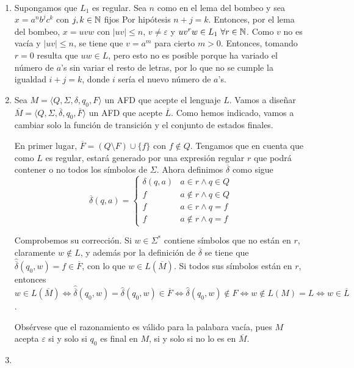 \documentclass[11pt]{article}
\begin{document}
\begin{solucion}\
\begin{enumerate}
\item Supongamos que $L_1$ es regular. Sea $n$ como en el lema del bombeo y sea $x=a^nb^jc^k$ con $j,k\in\mathbb{N}$ fijos Por hipótesis $n+j=k$. Entonces, por el lema del bombeo, $x=uvw$ con $|uv|\leq n$, $v\neq\varepsilon$ y $uv^rw\in L_1\ \forall r\in\mathbb{N}$. Como $v$ no es vacía y $|uv|\leq n$, se tiene que $v=a^m$ para cierto $m>0$. Entonces, tomando $r=0$ resulta que $uw\in L$, pero esto no es posible porque ha variado el número de $a$'s sin variar el resto de letras, por lo que no se cumple la igualdad $i+j=k$, donde $i$ sería el nuevo número de $a$'s. 
\item Sea $M=\langle Q,\Sigma, \delta, q_0,F\rangle$ un AFD que acepte el lenguaje $L$. Vamos a diseñar $\overline{M}=\langle Q,\Sigma,\overline{\delta},q_0, \overline{F}\rangle$ un AFD que acepte $\overline{L}$. Como hemos indicado, vamos a cambiar solo la función de transición y el conjunto de estados finales. 

En primer lugar, $\overline{F}=(Q\setminus F)\cup\{f\}$ con $f\notin Q$. Tengamos que en cuenta que como $L$ es regular, estará generado por una expresión regular $r$ que podrá contener o no todos los símbolos de $\Sigma$. Ahora definimos $\overline{\delta}$ como sigue
\[
\overline{\delta}(q,a)=\begin{cases}
\delta(q,a) & a\in r\land q\in Q\\
 f & a\notin r\land q\in Q\\
 f   & a\in r\land q=f\\
 f & a\notin r\land q=f
\end{cases}
\]

Comprobemos su corrección. Si $w\in\Sigma^*$ contiene símbolos que no están en $r$, claramente $w\notin L$, y además por la definición de $\overline{\delta}$ se tiene que $\hat{\overline{\delta}}(q_0,w)=f\in\overline{F}$, con lo que $w\in L(\overline{M})$. Si todos sus símbolos están en $r$, entonces $w\in L(\overline{M})\Leftrightarrow\hat{\overline{\delta}}(q_0,w)=\hat{\delta}(q_0,w)\in \overline{F}\Leftrightarrow \hat{\delta}(q_0,w)\notin F\Leftrightarrow w\notin L(M)=L\Leftrightarrow w\in\overline{L}$.

Obsérvese que el razonamiento es válido para la palabara vacía, pues $M$ acepta $\varepsilon$ si y solo si $q_0$ es final en $M$, si y solo si no lo es en $\overline{M}$.

\item
\end{enumerate}
\end{solucion}
\end{document}

